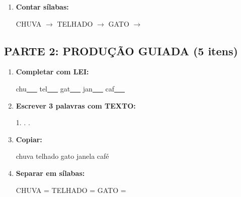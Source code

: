 \begin{exercicio}
\begin{enumerate}
  \item \textbf{Contar sílabas:}
  \begin{center}
  CHUVA $\rightarrow$ \underline{\hspace{0.9cm}} \quad TELHADO $\rightarrow$ \underline{\hspace{0.9cm}} \quad GATO $\rightarrow$ \underline{\hspace{0.9cm}}
  \end{center}

\end{enumerate}

\subsection*{PARTE 2: PRODUÇÃO GUIADA (5 itens)}

\begin{enumerate}[resume]

  \item \textbf{Completar com LEI:}
  \begin{center}
  chu\underline{~~~} \quad tel\underline{~~~} \quad gat\underline{~~~} \quad jan\underline{~~~} \quad caf\underline{~~~}
  \end{center}

  \item \textbf{Escrever 3 palavras com TEXTO:}
  \begin{center}
  1. \underline{\hspace{3cm}} . \underline{\hspace{3cm}} . \underline{\hspace{3cm}}
  \end{center}

  \item \textbf{Copiar:}
  \begin{center}
  chuva \quad telhado \quad gato \quad janela \quad café
  \end{center}

  \item \textbf{Separar em sílabas:}
  \begin{center}
  CHUVA = \underline{\hspace{1cm}} \underline{\hspace{1cm}} \quad TELHADO = \underline{\hspace{1cm}} \underline{\hspace{1cm}} \quad GATO = \underline{\hspace{1cm}} \underline{\hspace{1cm}}
  \end{center}


\end{enumerate}
\end{exercicio}
